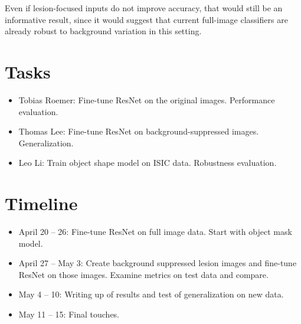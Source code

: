 \documentclass{article}
\begin{document}
Even if lesion-focused inputs do not improve accuracy, that would still be an informative result, since it would suggest that current full-image classifiers are already robust to background variation in this setting.

\section*{Tasks}
\begin{itemize}
    \item Tobias Roemer: Fine-tune ResNet on the original images. Performance evaluation.
    \item Thomas Lee: Fine-tune ResNet on background-suppressed images. Generalization.
    \item Leo Li: Train object shape model on ISIC data. Robustness evaluation.
\end{itemize}

\section*{Timeline}

\begin{itemize}
    \item April 20 -- 26: Fine-tune ResNet on full image data. Start with object mask model.
    \item April 27 -- May 3: Create background suppressed lesion images and fine-tune ResNet on those images. Examine metrics on test data and compare.
    \item May 4 -- 10: Writing up of results and test of generalization on new data.
    \item May 11 -- 15: Final touches.
\end{itemize}
\end{document}
